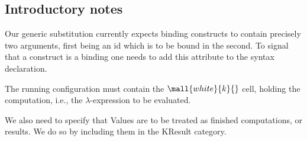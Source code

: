 \begin{kblock}[text]
\section{Introductory notes}

Our generic substitution currently expects binding constructs to contain
precisely two arguments, first being an id which is to be bound in the second.
To signal that a construct is a binding one needs to add this attribute  
to the syntax declaration.

The running configuration must contain the $\mall{white}{k}{}$ cell, 
holding the computation, i.e., the $\lambda$-expression to be evaluated.  

We also need to specify that Values are to be treated as finished computations,
or results.  
We do so by including them in the KResult category.
\end{kblock}
